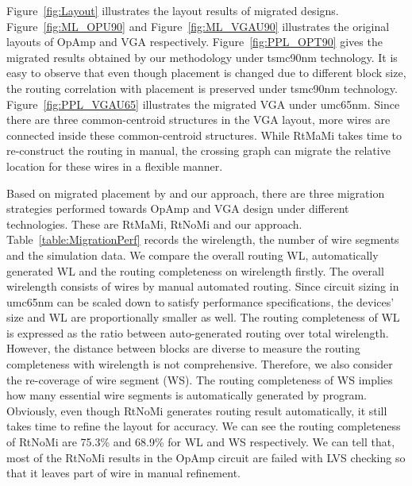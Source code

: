       Figure~\ref{fig:Layout} illustrates the layout results of migrated designs. Figure~\ref{fig:ML_OPU90} and Figure~\ref{fig:ML_VGAU90} illustrates the original layouts of OpAmp and VGA respectively. Figure~\ref{fig:PPL_OPT90} gives the migrated results obtained by our methodology under tsmc90nm technology. It is easy to observe that even though placement is changed due to different block size, the routing correlation with placement is preserved under tsmc90nm technology. Figure~\ref{fig:PPL_VGAU65} illustrates the migrated VGA under umc65nm. Since there are three common-centroid structures in the VGA layout, more wires are connected inside these common-centroid structures. While RtMaMi takes time to re-construct the routing in manual, the crossing graph can migrate the relative location for these wires in a flexible manner.


      Based on migrated placement by \cite{msc-bhattacharya-tcad06} and our approach, there are three migration strategies performed towards OpAmp and VGA design under different technologies. These are RtMaMi, RtNoMi and our approach. Table~\ref{table:MigrationPerf} records the wirelength, the number of wire segments and the simulation data. We compare the overall routing WL, automatically generated WL and the routing completeness on wirelength firstly. The overall wirelength consists of wires by manual automated routing. Since circuit sizing in umc65nm can be scaled down to satisfy performance specifications, the devices' size and WL are proportionally smaller as well. The routing completeness of WL is expressed as the ratio between auto-generated routing over total wirelength. However, the distance between blocks are diverse to measure the routing completeness with wirelength is not comprehensive. Therefore, we also consider the re-coverage of wire segment (WS). The routing completeness of WS implies how many essential wire segments is automatically generated by program. Obviously, even though RtNoMi generates routing result automatically, it still takes time to refine the layout for accuracy. We can see the routing completeness of RtNoMi are 75.3\% and 68.9\% for WL and WS respectively. We can tell that, most of the RtNoMi results in the OpAmp circuit are failed with LVS checking so that it leaves part of wire in manual refinement.


